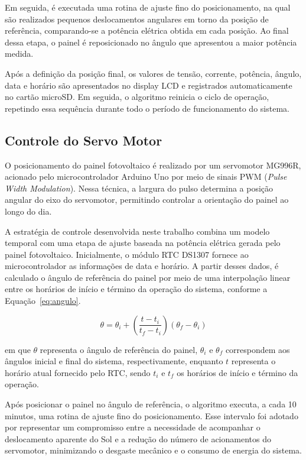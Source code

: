 Em seguida, é executada uma rotina de ajuste fino do posicionamento, na qual são realizados pequenos deslocamentos angulares em torno da posição de referência, comparando-se a potência elétrica obtida em cada posição. Ao final dessa etapa, o painel é reposicionado no ângulo que apresentou a maior potência medida.

Após a definição da posição final, os valores de tensão, corrente, potência, ângulo, data e horário são apresentados no display LCD e registrados automaticamente no cartão microSD. Em seguida, o algoritmo reinicia o ciclo de operação, repetindo essa sequência durante todo o período de funcionamento do sistema.

\subsection{Controle do Servo Motor}

O posicionamento do painel fotovoltaico é realizado por um servomotor MG996R, acionado pelo microcontrolador Arduino Uno por meio de sinais PWM (\textit{Pulse Width Modulation}). Nessa técnica, a largura do pulso determina a posição angular do eixo do servomotor, permitindo controlar a orientação do painel ao longo do dia.

A estratégia de controle desenvolvida neste trabalho combina um modelo temporal com uma etapa de ajuste baseada na potência elétrica gerada pelo painel fotovoltaico. Inicialmente, o módulo RTC DS1307 fornece ao microcontrolador as informações de data e horário. A partir desses dados, é calculado o ângulo de referência do painel por meio de uma interpolação linear entre os horários de início e término da operação do sistema, conforme a Equação~\ref{eq:angulo}.

\begin{equation}
\theta=\theta_i+\left(\frac{t-t_i}{t_f-t_i}\right)(\theta_f-\theta_i)
\label{eq:angulo}
\end{equation}

em que $\theta$ representa o ângulo de referência do painel, $\theta_i$ e $\theta_f$ correspondem aos ângulos inicial e final do sistema, respectivamente, enquanto $t$ representa o horário atual fornecido pelo RTC, sendo $t_i$ e $t_f$ os horários de início e término da operação.

Após posicionar o painel no ângulo de referência, o algoritmo executa, a cada 10 minutos, uma rotina de ajuste fino do posicionamento. Esse intervalo foi adotado por representar um compromisso entre a necessidade de acompanhar o deslocamento aparente do Sol e a redução do número de acionamentos do servomotor, minimizando o desgaste mecânico e o consumo de energia do sistema.

